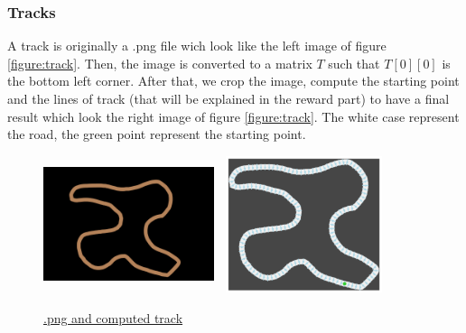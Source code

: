 \documentclass[11pt,a4paper]{article}
\newcounter{fig}
\begin{document}
			\subsubsection*{Tracks}
A track is originally a .png file wich look like the left image of figure \ref{figure:track}. Then, the image is converted to a matrix $T$ such that $T[0][0]$ is the bottom left corner. After that, we crop the image, compute the starting point and the lines of track (that will be explained in the reward part) to have a final result which look the right image of figure \ref{figure:track}. The white case represent the road, the green point represent the starting point.
\begin{center}
\label{figure:track}
	\begin{figure}[ht]
		\centering
		\includegraphics[width=5cm, height=4cm]{track_06.png}
		\includegraphics[width=5cm, height=4cm]{track_06_computed.png}
		\caption{\underline{.png and computed track}}
	\end{figure}
\end{center}

	
\end{document}
